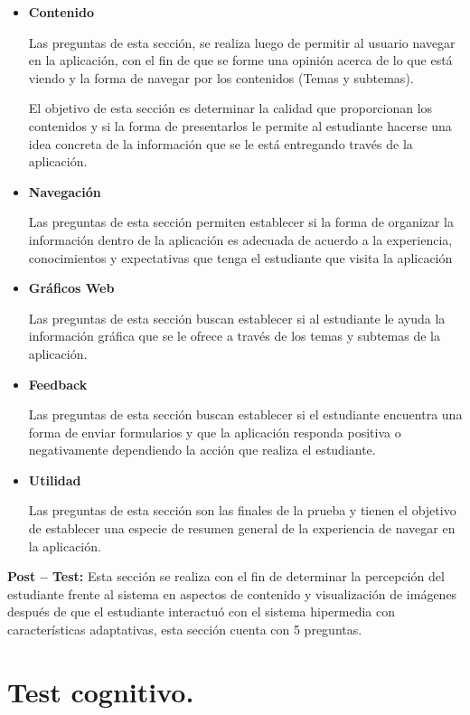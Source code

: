 \begin{itemize}

\item \textbf{Contenido}

Las preguntas de esta sección, se realiza luego de permitir al usuario navegar en la aplicación, con el fin de que se forme una opinión acerca de lo que está viendo y la forma de navegar por los contenidos (Temas y subtemas).

El objetivo de esta sección es determinar la calidad que proporcionan los contenidos y si la forma de presentarlos le permite al estudiante hacerse una idea concreta de la información que se le está entregando través de la aplicación. 

\item \textbf{Navegación} 

Las preguntas de esta sección permiten establecer si la forma de organizar la información dentro de la aplicación es adecuada de acuerdo a la experiencia, conocimientos y expectativas que tenga el estudiante que visita la aplicación

\item \textbf{Gráficos Web}

Las preguntas de esta sección buscan establecer si al estudiante le ayuda la información gráfica que se le ofrece a través de los temas y subtemas de la aplicación.

\item \textbf{Feedback}

Las preguntas de esta sección buscan establecer si el estudiante encuentra una forma de enviar formularios y que la aplicación responda positiva o negativamente dependiendo la acción que realiza el estudiante.

\item \textbf{Utilidad}

Las preguntas de esta sección son las finales de la prueba y tienen el objetivo de establecer una especie de resumen general de la experiencia de navegar en la aplicación.
\end{itemize}
\textbf{Post – Test:} Esta sección se realiza con el fin de determinar la percepción del estudiante frente al sistema en aspectos de contenido y visualización de imágenes después de que el estudiante interactuó con el sistema hipermedia con características adaptativas, esta sección cuenta con 5 preguntas.


\section{Test cognitivo.}

